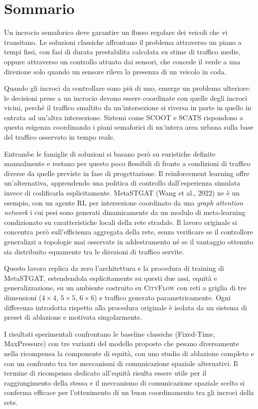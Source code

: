 \chapter*{Sommario}

Un incrocio semaforico deve garantire un flusso regolare dei veicoli che
vi transitano. Le soluzioni classiche affrontano il problema attraverso
un piano a tempi fissi, con fasi di durata prestabilita calcolata su
stime di traffico medie, oppure attraverso un controllo attuato dai sensori, che
concede il verde a una direzione solo quando un sensore rileva la
presenza di un veicolo in coda.

Quando gli incroci da controllare sono più di uno, emerge un problema
ulteriore: le decisioni prese a un incrocio devono essere coordinate con
quelle degli incroci vicini, perché il traffico smaltito da un'intersezione si riversa in
parte in quello in entrata ad un'altra intersezione. Sistemi come SCOOT e SCATS rispondono a
questa esigenza coordinando i piani semaforici di un'intera area urbana
sulla base del traffico osservato in tempo reale.

Entrambe le famiglie di soluzioni si basano però su euristiche definite
manualmente e restano per questo poco flessibili di fronte a condizioni di
traffico diverse da quelle previste in fase di progettazione. Il
reinforcement learning offre un'alternativa, apprendendo una
politica di controllo dall'esperienza simulata invece di codificarla
esplicitamente. MetaSTGAT (Wang et al., 2022) ne è un esempio, con un agente RL per
intersezione coordinato da una \emph{graph attention network} i cui pesi
sono generati dinamicamente da un modulo di meta-learning condizionato su
caratteristiche locali della rete stradale. Il lavoro originale si
concentra però sull'efficienza aggregata della rete, senza verificare se
il controllore generalizzi a topologie mai osservate in addestramento né
se il vantaggio ottenuto sia distribuito equamente tra le direzioni di
traffico servite.

Questo lavoro replica da zero l'architettura e la procedura di training
di MetaSTGAT, estendendola esplicitamente su questi due assi, equità e
generalizzazione, su un ambiente costruito su \textsc{CityFlow} con reti
a griglia di tre dimensioni ($4\times4$, $5\times5$, $6\times6$) e
traffico generato parametricamente.
Ogni differenza introdotta rispetto alla procedura originale è isolata da un
sistema di preset di ablazione e motivata singolarmente.

I risultati sperimentali confrontano le baseline classiche (Fixed-Time,
MaxPressure) con tre varianti del modello proposto che pesano
diversamente nella ricompensa la componente di equità, con uno studio di
ablazione completo e con un confronto tra tre meccanismi di comunicazione
spaziale alternativi. Il termine di ricompensa dedicato all'equità
risulta essere utile per il raggiungimento della stessa e
il meccanismo di comunicazione spaziale scelto si conferma efficace
per l'ottenimento di un buon coordinamento tra gli incroci della rete.
